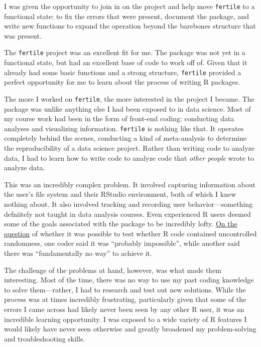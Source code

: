 \documentclass[12pt,twoside]{reedthesis}
\begin{document}
I was given the opportunity to join in on the project and help move
\texttt{fertile} to a functional state: to fix the errors that were
present, document the package, and write new functions to expand the
operation beyond the barebones structure that was present.

The \texttt{fertile} project was an excellent fit for me. The package
was not yet in a functional state, but had an excellent base of code to
work off of. Given that it already had some basic functions and a strong
structure, \texttt{fertile} provided a perfect opportunity for me to
learn about the process of writing R packages.

The more I worked on \texttt{fertile}, the more interested in the
project I became. The package was unlike anything else I had been
exposed to in data science. Most of my course work had been in the form
of front-end coding: conducting data analyses and visualizing
information. \texttt{fertile} is nothing like that. It operates
completely behind the scenes, conducting a kind of meta-analysis to
determine the reproducibility of a data science project. Rather than
writing code to analyze data, I had to learn how to write code to
analyze code that \emph{other people} wrote to analyze data.

This was an incredibly complex problem. It involved capturing
information about the user's file system and their RStudio environment,
both of which I knew nothing about. It also involved tracking and
recording user behavior---something defniitely not taught in data
analysis courses. Even experienced R users deemed some of the goals
associated with the package to be incredibly lofty.
\href{https://stackoverflow.com/questions/43638773/comprehensive-way-to-check-for-functions-that-use-the-random-number-generator-in}{On
the question} of whether it was possible to test whether R code
contained uncontrolled randomness, one coder said it was ``probably
impossible'', while another said there was ``fundamentally no way'' to
achieve it.

The challenge of the problems at hand, however, was what made them
interesting. Most of the time, there was no way to use my past coding
knowledge to solve them---rather, I had to research and test out new
solutions. While the process was at times incredibly frustrating,
particularly given that some of the errors I came across had likely
never been seen by any other R user, it was an incredible learning
opportunity. I was exposed to a wide variety of R features I would
likely have never seen otherwise and greatly broadened my
problem-solving and troubleshooting skills.
\end{document}
